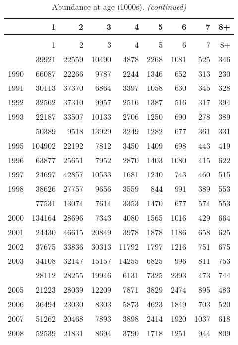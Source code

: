\documentclass[
]{article}
\begin{document}
\begin{longtable}[t]{lrrrrrrrr}
\caption{\label{tab:NAA-table}Abundance at age (1000s).}\\
\toprule
  & 1 & 2 & 3 & 4 & 5 & 6 & 7 & 8+\\
\midrule
\endfirsthead
\caption[]{Abundance at age (1000s). \textit{(continued)}}\\
\toprule
  & 1 & 2 & 3 & 4 & 5 & 6 & 7 & 8+\\
\midrule
\endhead

\endfoot
\bottomrule
\endlastfoot
1989 & 39921 & 22559 & 10490 & 4878 & 2268 & 1081 & 525 & 346\\
1990 & 66087 & 22266 & 9787 & 2244 & 1346 & 652 & 313 & 230\\
1991 & 30113 & 37370 & 6864 & 3397 & 1058 & 630 & 345 & 328\\
1992 & 32562 & 37310 & 9957 & 2516 & 1387 & 516 & 317 & 394\\
1993 & 22187 & 33507 & 10133 & 2706 & 1250 & 690 & 278 & 389\\
\addlinespace
1994 & 50389 & 9518 & 13929 & 3249 & 1282 & 677 & 361 & 331\\
1995 & 104902 & 22192 & 7812 & 3450 & 1409 & 698 & 443 & 419\\
1996 & 63877 & 25651 & 7952 & 2870 & 1403 & 1080 & 415 & 622\\
1997 & 24697 & 42857 & 10533 & 1681 & 1240 & 743 & 460 & 515\\
1998 & 38626 & 27757 & 9656 & 3559 & 844 & 991 & 389 & 553\\
\addlinespace
1999 & 77531 & 13074 & 7614 & 3353 & 1470 & 677 & 574 & 553\\
2000 & 134164 & 28696 & 7343 & 4080 & 1565 & 1016 & 429 & 664\\
2001 & 24430 & 46615 & 20849 & 3978 & 1878 & 1186 & 658 & 625\\
2002 & 37675 & 33836 & 30313 & 11792 & 1797 & 1216 & 751 & 675\\
2003 & 34108 & 32147 & 15157 & 14255 & 6825 & 996 & 811 & 753\\
\addlinespace
2004 & 28112 & 28255 & 19946 & 6131 & 7325 & 2393 & 473 & 744\\
2005 & 21223 & 28039 & 12209 & 7871 & 3829 & 2474 & 895 & 483\\
2006 & 36494 & 23030 & 8303 & 5873 & 4623 & 1849 & 703 & 520\\
2007 & 51262 & 20468 & 7893 & 3898 & 2414 & 1920 & 1037 & 618\\
2008 & 52539 & 21831 & 8694 & 3790 & 1718 & 1251 & 944 & 809\\

\end{longtable}
\end{document}
